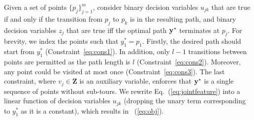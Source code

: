 Given a set of points $\{p_j\}_{j=1}^m$,
consider binary decision variables $u_{jk}$ that are true if and only if
the transition from $p_j$ to $p_k$ is in the resulting path,
and binary decision variables $z_j$ that are true iff
the optimal path $\mathbf{y}^*$ terminates at $p_j$.
For brevity, we index the points such that $y_1^* = p_1$.
Firstly, the desired path should start from $y_1^*$ (Constraint~\ref{eq:cons1}).
In addition, only $l\!-\!1$ transitions between points are permitted as the path length is $l$ (Constraint~\ref{eq:cons2}).
Moreover, any point could be visited at most once (Constraint~\ref{eq:cons3}).
The last constraint, where $v_j \in \mathbf{Z}$ is an auxiliary variable,
enforces that $\mathbf{y}^*$ is a single sequence of points without sub-tours.
We rewrite Eq.~(\ref{eq:jointfeature}) into a linear function of decision variables $u_{jk}$
(dropping the unary term corresponding to $y_1^*$ as it is a constant), which results in ~(\ref{eq:obj}).

